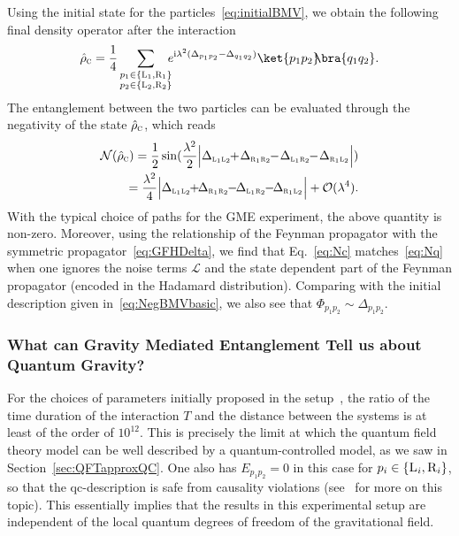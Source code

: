 \documentclass[letterpaper,12pt,titlepage,oneside,final]{book}
\newcommand{\ii}{\mathrm{i}}
\renewcommand{\r}{\hat{\rho}}
\newcommand{\tc}[1]{\textsc{#1}}
\begin{document}
Using the initial state for the particles~\eqref{eq:initialBMV}, we obtain the following final density operator after the interaction
\begin{equation}
    \hat{\rho}_{\tc{c}} = 
    \frac{1}{4}\sum_{{\substack{p_1\in\{\tc{L}_1,\tc{R}_1\}\\p_2\in\{\tc{L}_2,\tc{R}_2\}}}} \!\!\!e^{ {\ii \lambda^2}( \Delta_{p_1p_2}-\Delta_{q_1q_2})}\ket{p_1p_2}\!\!\bra{q_1q_2}.
\end{equation}
The entanglement between the two particles can be evaluated through the negativity of the state $\hat{\rho}_\tc{c}$, which reads
\begin{align}
    \mathcal{N}(\r_\tc{c}) = \frac{1}{2}\sin(\frac{\lambda^2}{2} \Big|{\Delta_{\tc{l}_1\tc{l}_2}\!\!+\!\Delta_{\tc{r}_1\tc{r}_2} \!\!-\! \Delta_{\tc{l}_1\tc{r}_2} \!\!-\! \Delta_{\tc{r}_1\tc{l}_2}}\Big|)\nonumber\\
    = {\frac{\lambda^2}{4}}\Big|{\Delta_{\tc{l}_1\tc{l}_2}\!\!+\!\!\Delta_{\tc{r}_1\tc{r}_2}\!\! -\!\! \Delta_{\tc{l}_1\tc{r}_2}\!\! -\!\! \Delta_{\tc{r}_1\tc{l}_2}}\Big|+\mathcal{O}(\lambda^4).\label{eq:Nc}
\end{align}
With the typical choice of paths for the GME experiment, the above quantity is non-zero. Moreover, using the relationship of the Feynman propagator with the symmetric propagator~\eqref{eq:GFHDelta}, we find that Eq.~\eqref{eq:Nc} matches~\eqref{eq:Nq} when one ignores the noise terms $\mathcal{L}$ and the state dependent part of the Feynman propagator (encoded in the Hadamard distribution). Comparing with the initial description given in~\eqref{eq:NegBMVbasic}, we also see that $\Phi_{p_1p_2} \sim \Delta_{p_1p_2}$.

 

\subsubsection*{What can Gravity Mediated Entanglement Tell us about Quantum Gravity?}

For the choices of parameters initially proposed in the setup~\cite{B,MV}, the ratio of the time duration of the interaction $T$ and the distance between the systems is at least of the order of $10^{12}$. This is precisely the limit at which the quantum field theory model can be well described by a quantum-controlled model, as we saw in Section~\ref{sec:QFTapproxQC}. One also has $E_{p_1p_2} = 0$ in this case for $p_i \in \{\tc{L}_i,\tc{R}_i\}$, so that the qc-description is safe from causality violations (see~\cite{eirini} for more on this topic). This essentially implies that the results in this experimental setup are independent of the local quantum degrees of freedom of the gravitational field.
\end{document}
